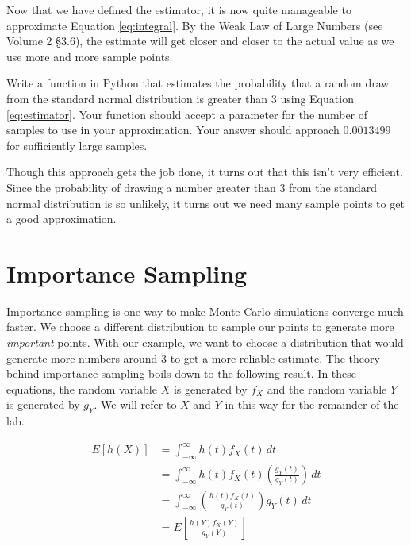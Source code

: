 Now that we have defined the estimator, it is now quite manageable to approximate Equation \ref{eq:integral}. By the Weak Law of Large Numbers (see Volume 2 \S 3.6), the estimate will get closer and closer to the actual value as we use more and more sample points.

\begin{problem} \label{prob:mc}
Write a function in Python that estimates the probability that a random draw from the standard normal distribution is greater than 3 using Equation \ref{eq:estimator}. Your function should accept a parameter  for the number of samples to use in your approximation. Your answer should approach $0.0013499$ for sufficiently large samples.
\end{problem}

Though this approach gets the job done, it turns out that this isn't very efficient. Since the probability of drawing a number greater than $3$ from the standard normal distribution is so unlikely, it turns out we need many sample points to get a good approximation.

\section*{Importance Sampling} %

Importance sampling is one way to make Monte Carlo simulations converge much faster. We choose a different distribution to sample our points to generate more \emph{important} points. With our example, we want to choose a distribution that would generate more numbers around $3$ to get a more reliable estimate. The theory behind importance sampling boils down to the following result. In these equations, the random variable $X$ is generated by $f_X$ and the random variable $Y$ is generated by $g_Y$. We will refer to $X$ and $Y$ in this way for the remainder of the lab.

\begin{equation} \label{eq:importance}
\begin{split}
E[h(X)] & = \int_{-\infty}^{\infty} h(t)f_X(t)\,dt \\
& = \int_{-\infty}^{\infty} h(t)f_X(t)\left ( \frac{g_Y(t)}{g_Y(t)} \right )\,dt \\
& = \int_{-\infty}^{\infty} \left ( \frac{h(t)f_X(t)}{g_Y(t)} \right )g_Y(t)\,dt \\
& = E\left [ \frac{h(Y)f_X(Y)}{g_Y(Y)}\right ]
\end{split}
\end{equation}

